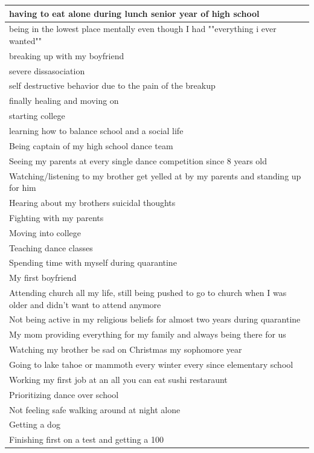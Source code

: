 \documentclass[
  .7em,
  letterpaper,
  DIV=11,
  numbers=noendperiod]{scrartcl}
\begin{document}
\begin{table}
\begin{tabular}{l}
\hline
having to eat alone during lunch senior year of high school\\
\hline
being in the lowest place mentally even though I had ""everything i ever wanted""\\
\hline
breaking up with my boyfriend\\
\hline
severe dissasociation\\
\hline
self destructive behavior due to the pain of the breakup\\
\hline
finally healing and moving on\\
\hline
starting college\\
\hline
learning how to balance school and a social life\\
\hline
Being captain of my high school dance team\\
\hline
Seeing my parents at every single dance competition since 8 years old\\
\hline
Watching/listening to my brother get yelled at by my parents and standing up for him\\
\hline
Hearing about my brothers suicidal thoughts\\
\hline
Fighting with my parents\\
\hline
Moving into college\\
\hline
Teaching dance classes\\
\hline
Spending time with myself during quarantine\\
\hline
My first boyfriend\\
\hline
Attending church all my life, still being pushed to go to church when I was older and didn't want to attend anymore\\
\hline
Not being active in my religious beliefs for almost two years during quarantine\\
\hline
My mom providing everything for my family and always being there for us\\
\hline
Watching my brother be sad on Christmas my sophomore year\\
\hline
Going to lake tahoe or mammoth every winter every since elementary school\\
\hline
Working my first job at an all you can eat sushi restaraunt\\
\hline
Prioritizing dance over school\\
\hline
Not feeling safe walking around at night alone\\
\hline
Getting a dog\\
\hline
Finishing first on a test and getting a 100\\

\end{tabular}
\end{table}
\end{document}
